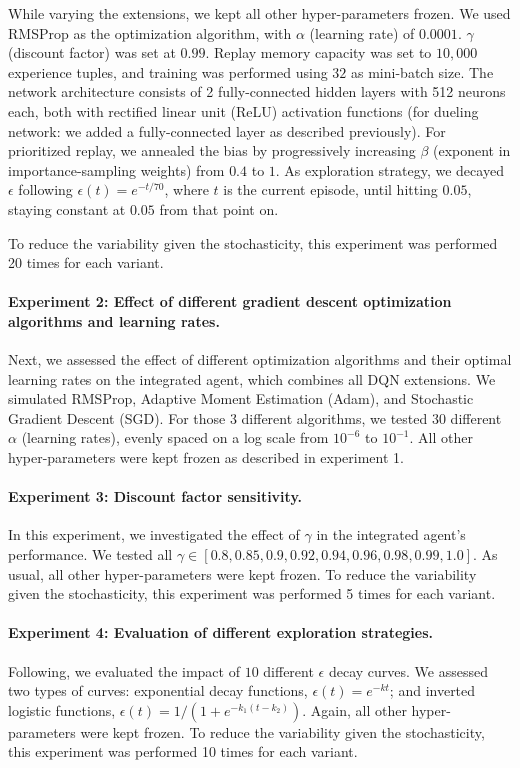 \documentclass{article}
\begin{document}
    While varying the extensions, we kept all other hyper-parameters frozen.
    We used RMSProp as the optimization algorithm, with $\alpha$ (learning rate) of $0.0001$.
    $\gamma$ (discount factor) was set at $0.99$.
    Replay memory capacity was set to $10,000$ experience tuples, and training was performed using $32$ as mini-batch size.
    The network architecture consists of 2 fully-connected hidden layers with 512 neurons each, both with rectified linear unit (ReLU) activation functions (for dueling network: we added a fully-connected layer as described previously).
    For prioritized replay, we annealed the bias by progressively increasing $\beta$ (exponent in importance-sampling weights) from $0.4$ to $1$.
    As exploration strategy, we decayed $\epsilon$ following $\epsilon(t) = e^{-t/70}$, where $t$ is the current episode, until hitting $0.05$, staying constant at $0.05$ from that point on.

    To reduce the variability given the stochasticity, this experiment was performed 20 times for each variant.

    \paragraph{Experiment 2: Effect of different gradient descent optimization algorithms and learning rates.}
    Next, we assessed the effect of different optimization algorithms and their optimal learning rates on the integrated agent, which combines all DQN extensions.
    We simulated RMSProp, Adaptive Moment Estimation (Adam), and Stochastic Gradient Descent (SGD).
    For those 3 different algorithms, we tested $30$ different $\alpha$ (learning rates), evenly spaced on a log scale from $10^{-6}$ to $10^{-1}$.
    All other hyper-parameters were kept frozen as described in experiment 1.

    \paragraph{Experiment 3: Discount factor sensitivity.}
    In this experiment, we investigated the effect of $\gamma$ in the integrated agent's performance.
    We tested all $\gamma \in [0.8, 0.85, 0.9, 0.92, 0.94, 0.96, 0.98, 0.99, 1.0]$.
    As usual, all other hyper-parameters were kept frozen.
    To reduce the variability given the stochasticity, this experiment was performed 5 times for each variant.

    \paragraph{Experiment 4: Evaluation of different exploration strategies.}
    Following, we evaluated the impact of $10$ different $\epsilon$ decay curves.
    We assessed two types of curves: exponential decay functions, $\epsilon(t) = e^{-k t}$; and inverted logistic functions, $\epsilon(t) = 1 / (1 + e^{-k_{1} (t - k_{2})})$.
    Again, all other hyper-parameters were kept frozen.
    To reduce the variability given the stochasticity, this experiment was performed 10 times for each variant.
\end{document}
